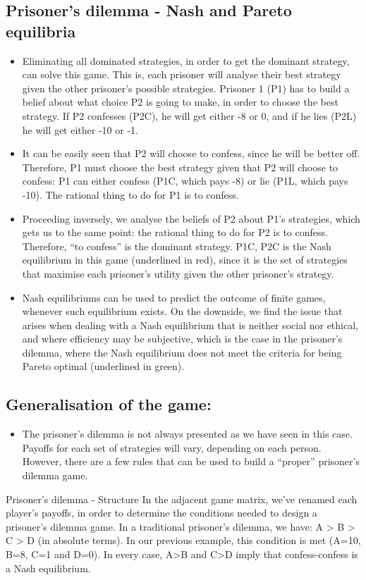 \documentclass[]{report}
\begin{document}
\subsection{Prisoner's dilemma - Nash and Pareto equilibria}
\begin{itemize}
\item Eliminating all dominated strategies, in order to get the dominant strategy, can solve this game. This is, each prisoner will analyse their best strategy given the other prisoner’s possible strategies. Prisoner 1 (P1) has to build a belief about what choice P2 is going to make, in order to choose the best strategy. If P2 confesses (P2C), he will get either -8 or 0, and if he lies (P2L) he will get either -10 or -1. 
	
\item It can be easily seen that P2 will choose to confess, since he will be better off. Therefore, P1 must choose the best strategy given that P2 will choose to confess: P1 can either confess (P1C, which pays -8) or lie (P1L, which pays -10). The rational thing to do for P1 is to confess. 
	
\item	Proceeding inversely, we analyse the beliefs of P2 about P1’s strategies, which gets us to the same point: the rational thing to do for P2 is to confess. Therefore, “to confess” is the dominant strategy. P1C, P2C is the Nash equilibrium in this game (underlined in red), since it is the set of strategies that maximise each prisoner’s utility given the other prisoner’s strategy.
	
\item Nash equilibriums can be used to predict the outcome of finite games, whenever such equilibrium exists. On the downside, we find the issue that arises when dealing with a Nash equilibrium that is neither social nor ethical, and where efficiency may be subjective, which is the case in the prisoner’s dilemma, where the Nash equilibrium does not meet the criteria for being Pareto optimal (underlined in green).
	
\end{itemize}



\subsection{Generalisation of the game:}
\begin{itemize}
\item The prisoner’s dilemma is not always presented as we have seen in this case. Payoffs for each set of strategies will vary, depending on each person. However, there are a few rules that can be used to build a “proper” prisoner’s dilemma game.
\end{itemize}
Prisoner's dilemma - Structure
In the adjacent game matrix, we’ve renamed each player’s payoffs, in order to determine the conditions needed to design a prisoner’s dilemma game. In a traditional prisoner’s dilemma, we have: A > B > C > D (in absolute terms). In our previous example, this condition is met (A=10, B=8, C=1 and D=0). In every case, A>B and C>D imply that confess-confess is a Nash equilibrium.
\end{document}
